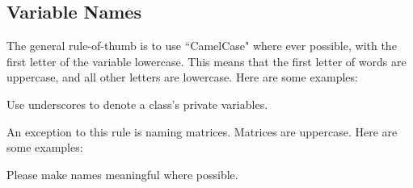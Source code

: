\subsection{Variable Names}

The general rule-of-thumb is to use ``CamelCase" where ever possible, with the first letter of the variable
lowercase.  This means that
the first letter of words are uppercase, and all other letters are lowercase.  Here are some examples:
\be
  \item {}
  \item {}
\ee
%
Use underscores to denote a class's private variables.
\be
  \item {}
  \item {}
\ee
%
An exception to this rule is naming matrices.  Matrices are uppercase.  Here are some examples:
\be
  \item {}
  \item {}
  \item {}
\ee
%
Please make names meaningful where possible.
